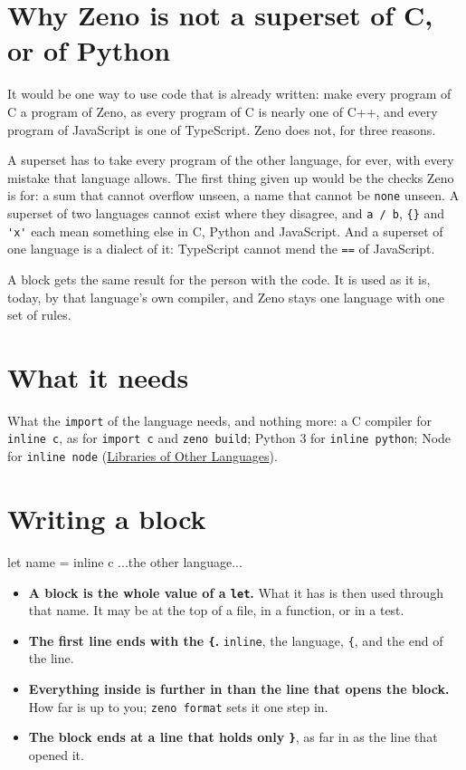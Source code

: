 \section{Why Zeno is not a superset of C, or of Python}

It would be one way to use code that is already written: make every
program of C a program of Zeno, as every program of C is nearly one of
C++, and every program of JavaScript is one of TypeScript. Zeno does
not, for three reasons.

A superset has to take every program of the other language, for ever,
with every mistake that language allows. The first thing given up
would be the checks Zeno is for: a sum that cannot overflow unseen, a
name that cannot be \verb|none| unseen. A superset of two languages
cannot exist where they disagree, and \verb|a / b|, \verb|{}| and
\verb|'x'| each mean something else in C, Python and JavaScript. And a
superset of one language is a dialect of it: TypeScript cannot mend
the \verb|==| of JavaScript.

A block gets the same result for the person with the code. It is
used as it is, today, by that language's own compiler, and Zeno stays
one language with one set of rules.

\section{What it needs}

What the \verb|import| of the language needs, and nothing more: a C
compiler for \verb|inline c|, as for \verb|import c| and
\verb|zeno build|; Python 3 for \verb|inline python|; Node for
\verb|inline node|
(\hyperref[ch-other-languages]{Libraries of Other Languages}).

\section{Writing a block}

\begin{zenofrag}[parse=no]
let name = inline c {
    ...the other language...
}
\end{zenofrag}

\begin{itemize}
\item \textbf{A block is the whole value of a \texttt{let}.} What it
  has is then used through that name. It may be at the top of a file,
  in a function, or in a test.
\item \textbf{The first line ends with the \texttt{\{}.}
  \verb|inline|, the language, \verb|{|, and the end of the line.
\item \textbf{Everything inside is further in than the line that
  opens the block.} How far is up to you; \verb|zeno format| sets it
  one step in.
\item \textbf{The block ends at a line that holds only \texttt{\}}},
  as far in as the line that opened it.
\end{itemize}

